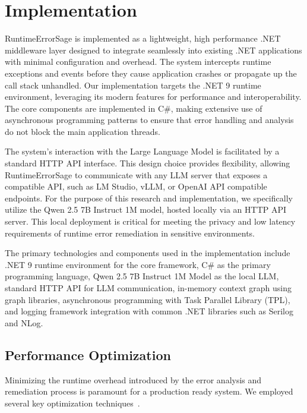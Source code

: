 \section{Implementation}\label{sec:implementation}
RuntimeErrorSage is implemented as a lightweight, high performance .NET middleware layer designed to integrate seamlessly into existing .NET applications with minimal configuration and overhead. The system intercepts runtime exceptions and events before they cause application crashes or propagate up the call stack unhandled. Our implementation targets the .NET 9 runtime environment, leveraging its modern features for performance and interoperability. The core components are implemented in C\#, making extensive use of asynchronous programming patterns to ensure that error handling and analysis do not block the main application threads.

The system's interaction with the Large Language Model is facilitated by a standard HTTP API interface. This design choice provides flexibility, allowing RuntimeErrorSage to communicate with any LLM server that exposes a compatible API, such as LM Studio, vLLM, or OpenAI API compatible endpoints. For the purpose of this research and implementation, we specifically utilize the Qwen 2.5 7B Instruct 1M model, hosted locally via an HTTP API server. This local deployment is critical for meeting the privacy and low latency requirements of runtime error remediation in sensitive environments.

The primary technologies and components used in the implementation include .NET 9 runtime environment for the core framework, C\# as the primary programming language, Qwen 2.5 7B Instruct 1M Model as the local LLM, standard HTTP API for LLM communication, in-memory context graph using graph libraries, asynchronous programming with Task Parallel Library (TPL), and logging framework integration with common .NET libraries such as Serilog and NLog.

\subsection{Performance Optimization}
Minimizing the runtime overhead introduced by the error analysis and remediation process is paramount for a production ready system. We employed several key optimization techniques~\cite{llm_inference_optimization_2021, performance_tuning_dotnet_2020}.

